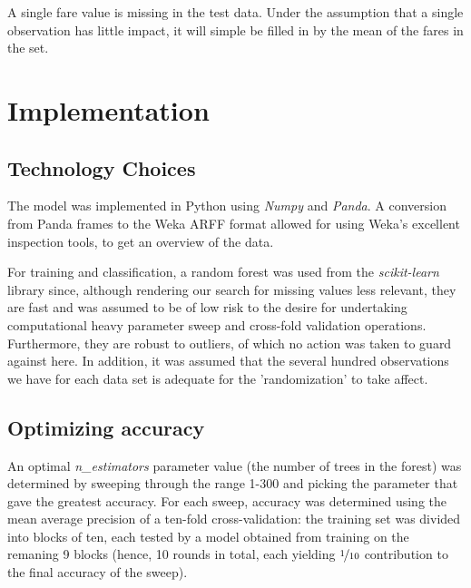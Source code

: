 \documentclass[11.5pt]{article}
\newcommand{\ti}[1] {\textit{#1}}
\newcommand\ifrac[2]{\nicefrac{#1}{#2}}
\def\i#1/#2{ \ifrac{#1}{#2}  }
\begin{document}
A single fare value is missing in the test data. Under the assumption that a single observation has little impact, it will simple be filled in by the mean of the fares in the set.



%
%

%
%
%

\section{Implementation}

\subsection*{Technology Choices}

The model was implemented in Python using \ti{Numpy} and \ti{Panda}. A conversion from Panda frames to the Weka ARFF format allowed for using Weka's excellent inspection tools, to get an overview of the data. 

For training and classification,  a random forest was used from the \ti{scikit-learn} library since, although rendering our search for missing values less relevant, they are fast and was assumed to be of low risk to the desire for undertaking computational heavy parameter sweep and cross-fold validation operations. Furthermore, they are robust to outliers, of which no action was taken to guard against here. In addition, it was assumed that the  several hundred observations we have for each  data set is adequate for the 'randomization' to take affect. 

\subsection*{Optimizing accuracy}

An optimal \ti{n\_estimators} parameter value (the number of trees in the forest)  was determined by sweeping through the range 1-300 and picking the parameter that gave the greatest accuracy. For each sweep, accuracy was determined using the mean average precision of a ten-fold cross-validation: the training set was divided into blocks of ten, each tested by a model obtained from training on the remaning 9 blocks (hence, 10 rounds in total, each yielding $\i1/{10}$ contribution to the final accuracy of the sweep). 
\end{document}
